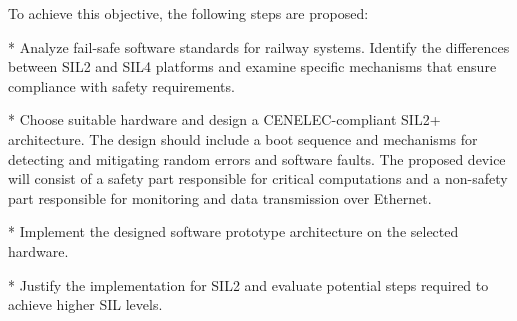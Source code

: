 To achieve this objective, the following steps are proposed:

\begitems  
* Analyze fail-safe software standards for railway systems. Identify the differences between SIL2 and SIL4 platforms and examine specific mechanisms that ensure compliance with safety requirements.

* Choose suitable hardware and design a CENELEC-compliant SIL2+ architecture. The design should include a boot sequence and mechanisms for detecting and mitigating random errors and software faults. The proposed device will consist of a safety part responsible for critical computations and a non-safety part responsible for monitoring and data transmission over Ethernet.

* Implement the designed software prototype architecture on the selected hardware.

* Justify the implementation for SIL2 and evaluate potential steps required to achieve higher SIL levels.
\enditems